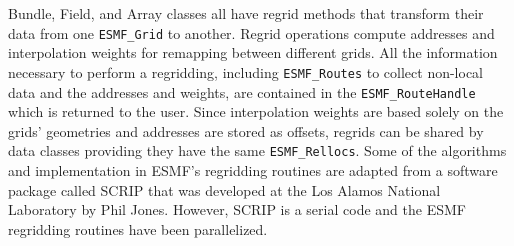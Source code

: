%


Bundle, Field, and Array classes all have regrid methods that transform their
data from one {\tt ESMF\_Grid} to another.  Regrid operations compute addresses
and interpolation weights for remapping between different grids.  All
the information necessary to perform a regridding, including {\tt ESMF\_Routes}
to collect non-local data and the addresses and weights, are contained in the
{\tt ESMF\_RouteHandle} which is returned to the user.  Since interpolation
weights are based solely on the grids' geometries and addresses are stored
as offsets, regrids can be shared by data classes providing
they have the same {\tt ESMF\_Rellocs}.  Some of the algorithms and 
implementation in ESMF's regridding routines are adapted from a software package
called SCRIP that was developed at the Los Alamos National Laboratory by Phil
Jones.  However, SCRIP is a serial code and the ESMF regridding routines have
been parallelized.

